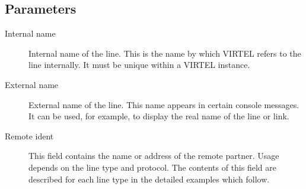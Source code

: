 \documentclass[letterpaper,10pt,english]{sphinxmanual}
\begin{document}

\subsection{Parameters}
\label{\detokenize{connectivity_guide:index-8}}\label{\detokenize{connectivity_guide:parameters}}\begin{description}
\item[{Internal name}] \leavevmode
Internal name of the line. This is the name by which VIRTEL refers to the line internally. It must be unique within a VIRTEL instance.

\item[{External name}] \leavevmode
External name of the line. This name appears in certain console messages. It can be used, for example, to display the real name of the line or link.

\item[{Remote ident}] \leavevmode
This field contains the name or address of the remote partner. Usage
depends on the line type and protocol. The contents of this field
are described for each line type in the detailed examples which
follow.

\end{description}
\end{document}
